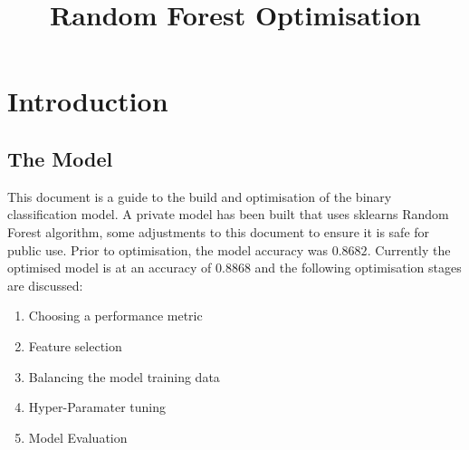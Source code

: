 \documentclass[11pt, oneside]{article}   	%
\title{Random Forest Optimisation }
\begin{document}
\maketitle
\section{Introduction}

\subsection{The  Model}
This document is a guide to the build and optimisation of the binary classification model. A private model has been built that uses sklearns Random Forest algorithm, some adjustments to this document to ensure it is safe for public use. Prior to optimisation, the model accuracy was $0.8682$. Currently the optimised model is at an accuracy of $0.8868$ and the following optimisation stages are discussed:


\begin{enumerate}
	\item Choosing a performance metric
	\item Feature selection
	\item Balancing the model training data
	\item Hyper-Paramater tuning
	\item Model Evaluation
\end{enumerate}
\end{document}
